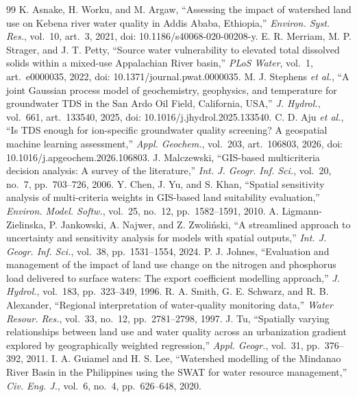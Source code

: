 \documentclass[10pt,twocolumn,letterpaper]{article}
\begin{document}
\footnotesize
\balance
\begin{thebibliography}{99}
 K. Asnake, H. Worku, and M. Argaw, ``Assessing the impact of watershed land use on Kebena river water quality in Addis Ababa, Ethiopia,'' \textit{Environ. Syst. Res.}, vol.~10, art.~3, 2021, doi: 10.1186/s40068-020-00208-y.
 E. R. Merriam, M. P. Strager, and J. T. Petty, ``Source water vulnerability to elevated total dissolved solids within a mixed-use Appalachian River basin,'' \textit{PLoS Water}, vol.~1, art.~e0000035, 2022, doi: 10.1371/journal.pwat.0000035.
 M. J. Stephens \textit{et al.}, ``A joint Gaussian process model of geochemistry, geophysics, and temperature for groundwater TDS in the San Ardo Oil Field, California, USA,'' \textit{J. Hydrol.}, vol.~661, art.~133540, 2025, doi: 10.1016/j.jhydrol.2025.133540.
 C. D. Aju \textit{et al.}, ``Is TDS enough for ion-specific groundwater quality screening? A geospatial machine learning assessment,'' \textit{Appl. Geochem.}, vol.~203, art.~106803, 2026, doi: 10.1016/j.apgeochem.2026.106803.
 J. Malczewski, ``GIS-based multicriteria decision analysis: A survey of the literature,'' \textit{Int. J. Geogr. Inf. Sci.}, vol.~20, no.~7, pp.~703--726, 2006.
 Y. Chen, J. Yu, and S. Khan, ``Spatial sensitivity analysis of multi-criteria weights in GIS-based land suitability evaluation,'' \textit{Environ. Model. Softw.}, vol.~25, no.~12, pp.~1582--1591, 2010.
 A. Ligmann-Zielinska, P. Jankowski, A. Najwer, and Z. Zwoli\'nski, ``A streamlined approach to uncertainty and sensitivity analysis for models with spatial outputs,'' \textit{Int. J. Geogr. Inf. Sci.}, vol.~38, pp.~1531--1554, 2024.
 P. J. Johnes, ``Evaluation and management of the impact of land use change on the nitrogen and phosphorus load delivered to surface waters: The export coefficient modelling approach,'' \textit{J. Hydrol.}, vol.~183, pp.~323--349, 1996.
 R. A. Smith, G. E. Schwarz, and R. B. Alexander, ``Regional interpretation of water-quality monitoring data,'' \textit{Water Resour. Res.}, vol.~33, no.~12, pp.~2781--2798, 1997.
 J. Tu, ``Spatially varying relationships between land use and water quality across an urbanization gradient explored by geographically weighted regression,'' \textit{Appl. Geogr.}, vol.~31, pp.~376--392, 2011.
 I. A. Guiamel and H. S. Lee, ``Watershed modelling of the Mindanao River Basin in the Philippines using the SWAT for water resource management,'' \textit{Civ. Eng. J.}, vol.~6, no.~4, pp.~626--648, 2020.

\end{thebibliography}
\end{document}
